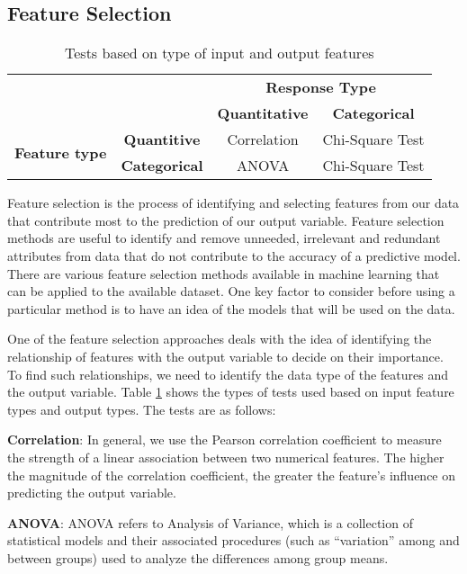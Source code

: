 \documentclass[11pt,openright]{report}
\begin{document}
\subsection {Feature Selection}
\begin{table}
	\renewcommand{\arraystretch}{1.3}
	\caption{Tests based on type of input and output features}
	\label{table:statistical_db}
	\centering
	\begin{tabular}{|c|c|c|c|}
    \hline
    \multicolumn{2}{|c|}{} & \multicolumn{2}{|c|}{ \bfseries Response Type}\\ \cline{3-4}
      \multicolumn{2}{|c|}{} & \bfseries Quantitative & \bfseries Categorical\\ \hline
     \multirow{2}{*}{ \bfseries Feature type}   &  \bfseries Quantitive & Correlation & Chi-Square Test \\ \cline{2-4}
     & \bfseries Categorical & ANOVA & Chi-Square Test\\
    \hline

\end{tabular}
\end{table}
Feature selection is the process of identifying and selecting features from our data that contribute most to the prediction of our output variable. Feature selection methods are useful to identify and remove unneeded, irrelevant and redundant attributes from data that do not contribute to the accuracy of a predictive model. There are various feature selection methods available in machine learning that can be applied to the available dataset. One key factor to consider before using a particular method is to have an idea of the models that will be used on the data. 

One of the feature selection approaches deals with the idea of identifying the relationship of features with the output variable to decide on their importance. To find such relationships, we need to identify the data type of the features and the output variable. Table \ref{table:statistical_db} shows the types of tests used based on input feature types and output types. The tests are as follows: 

\noindent \textbf{Correlation}: In general, we use the Pearson correlation coefficient to measure the strength of a linear association between two numerical features. The higher the magnitude of the correlation coefficient, the greater the feature's influence on predicting the output variable.

\noindent \textbf{ANOVA}: ANOVA refers to Analysis of Variance, which is a collection of statistical models and their associated procedures (such as ``variation'' among and between groups) used to analyze the differences among group means.
\end{document}
